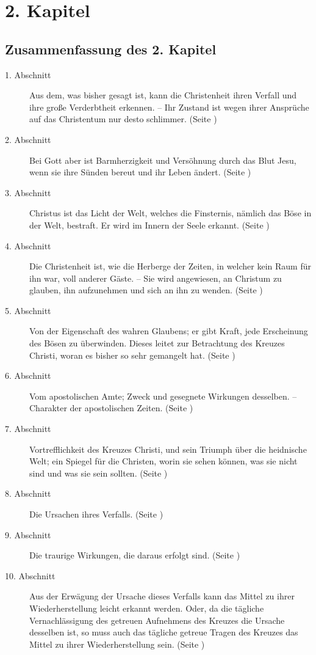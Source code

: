 
\chapter{2. Kapitel}  \label{kap2}


\section{Zusammenfassung des 2. Kapitel}
\footnotesize
\begin{description}
\item[1. Abschnitt] Aus dem, was bisher gesagt ist, kann die Christenheit ihren
Verfall und ihre große Verderbtheit erkennen. -- Ihr Zustand ist wegen ihrer
Ansprüche auf das Christentum%
 nur desto schlimmer. (Seite \pageref{kap2_ab1})
\item[2. Abschnitt] Bei Gott aber ist Barmherzigkeit und Versöhnung durch das
Blut Jesu, wenn sie ihre Sünden bereut und ihr Leben ändert. (Seite
\pageref{kap2_ab2})
\item[3. Abschnitt] Christus ist das Licht der Welt, welches die Finsternis,
nämlich das Böse in der Welt, bestraft. Er wird im Innern der Seele erkannt.
(Seite \pageref{kap2_ab3})
\item[4. Abschnitt] Die Christenheit ist, wie die Herberge der Zeiten, in
welcher kein Raum für ihn war, voll anderer Gäste. -- Sie wird angewiesen, an
Christum zu glauben, ihn aufzunehmen und sich an ihn zu wenden. (Seite
\pageref{kap2_ab4})
\item[5. Abschnitt] Von der Eigenschaft des wahren Glaubens; er gibt Kraft,
jede Erscheinung des Bösen zu überwinden. Dieses leitet%
 zur Betrachtung des
Kreuzes Christi, woran es bisher so sehr gemangelt hat. (Seite
\pageref{kap2_ab5})
\item[6. Abschnitt] Vom apostolischen Amte; Zweck und gesegnete Wirkungen
desselben. -- Charakter der apostolischen Zeiten. (Seite \pageref{kap2_ab6})
\item[7. Abschnitt] Vortrefflichkeit des Kreuzes Christi, und sein Triumph über
die heidnische Welt; ein Spiegel für die Christen, worin sie sehen können, was
sie nicht sind und was sie sein sollten. (Seite \pageref{kap2_ab7})
\item[8. Abschnitt] Die Ursachen ihres Verfalls. (Seite \pageref{kap2_ab8})
\item[9. Abschnitt] Die traurige Wirkungen, die daraus erfolgt sind. (Seite
\pageref{kap2_ab9})
\item[10. Abschnitt] Aus der Erwägung der Ursache dieses Verfalls kann das
Mittel zu ihrer Wiederherstellung leicht erkannt werden. Oder, da die tägliche
Vernachlässigung des getreuen Aufnehmens des Kreuzes die Ursache desselben ist,
so muss auch das tägliche getreue Tragen des Kreuzes das Mittel zu ihrer
Wiederherstellung sein. (Seite \pageref{kap2_ab10})
\end{description}
\normalsize

